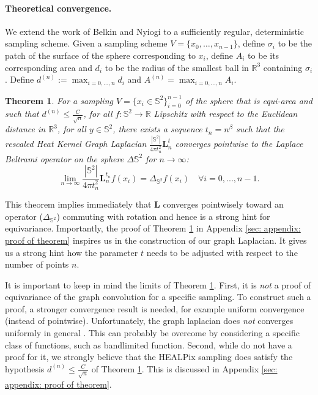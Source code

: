\documentclass{article} %
\newtheorem{theorem}{Theorem}[section]
\renewcommand{\b}[1]{{\bm{#1}}}   %
\newcommand{\todo}[1]{{\color[rgb]{.6,.1,.6}{#1}}}
\begin{document}
\paragraph{Theoretical convergence.}
We extend the work of Belkin and Nyiogi to a sufficiently regular, deterministic sampling scheme. 
Given a sampling scheme $V = \{x_0, \dots, x_{n-1}\}$, define $\sigma_i$ to be the patch of the surface of the sphere corresponding to $x_i$, define $A_i$ to be its corresponding area and $d_i$ to be the radius of the smallest ball in $\mathbb R^3$ containing $\sigma_i$. Define $d^{(n)} := \max_{i=0, \dots, n}d_i$ and $A^{(n)}=\max_{i=0, \dots, n}A_i$.
\begin{theorem}
	For a sampling $V = \{x_i\in\mathbb S^2\}_{i=0}^{n-1}$ of the sphere that is equi-area and such that $d^{(n)} \leq \frac{C}{\sqrt{n}}$, for all $f: \mathbb S^2 \rightarrow \mathbb R$ Lipschitz with respect to the Euclidean distance in $\mathbb R^3$, for all $y\in\mathbb S^2$, there exists a sequence $t_n = n^\beta$ such that the rescaled Heat Kernel Graph Laplacian $\frac{|\mathbb S^2|}{4\pi t_n^2}\b {L}^t_n$ converges pointwise to the Laplace Beltrami operator on the sphere $\Delta{\mathbb S^2}$  for $n\to\infty$:
	$$ \lim_{n\to\infty} \frac{|\mathbb{S}^2|}{4\pi t_n^2} \b{L}_n^{t_n} f(x_i) =  \Delta_{\mathbb{S}^2}f(x_i)\quad \forall i=0, ..., n-1.$$
	\label{theo:pointwise convergence for a regular sampling}
\end{theorem}
This theorem implies immediately that $\b{L}$ converges pointwisely toward an operator ($\Delta_{\mathbb S^2}$) commuting with rotation and hence is a strong hint for equivariance.
Importantly, the proof of Theorem \ref{theo:pointwise convergence for a regular sampling} in Appendix \ref{sec: appendix: proof of theorem} inspires us in the construction of our graph Laplacian. It gives us a strong hint how the parameter $t$ needs to be adjusted with respect to the number of points $n$.

It is important to keep in mind the limits of Theorem \ref{theo:pointwise convergence for a regular sampling}.
First, it is \emph{not} a proof of equivariance of the graph convolution for a specific sampling. To construct such a proof, a stronger convergence result is needed, for example uniform convergence (instead of pointwise).
\todo{Can we intuitively write what pointwise convergence means, and how it is more limited than spectral or uniform convergence?}
Unfortunately, the graph laplacian does \emph{not} converges uniformly in general \cite{belkin2007convergence}. This can probably be overcome by considering a specific class of functions, such as bandlimited function.
Second, while do not have a proof for it, we strongly believe that the HEALPix sampling does satisfy the hypothesis $d^{(n)}\leq \frac{C}{\sqrt{n}}$ of Theorem \ref{theo:pointwise convergence for a regular sampling}. This is discussed in Appendix \ref{sec: appendix: proof of theorem}.
\end{document}
